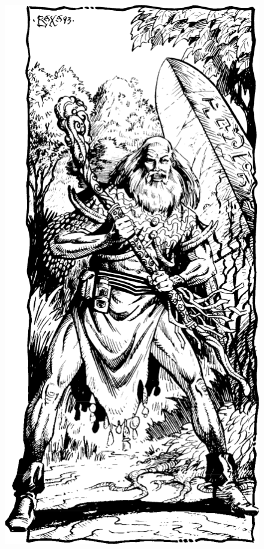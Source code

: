 \begin{figure}[t!]
\centering
\includegraphics[width=\columnwidth]{images/druid-2.png}
\WOTC
\end{figure}

